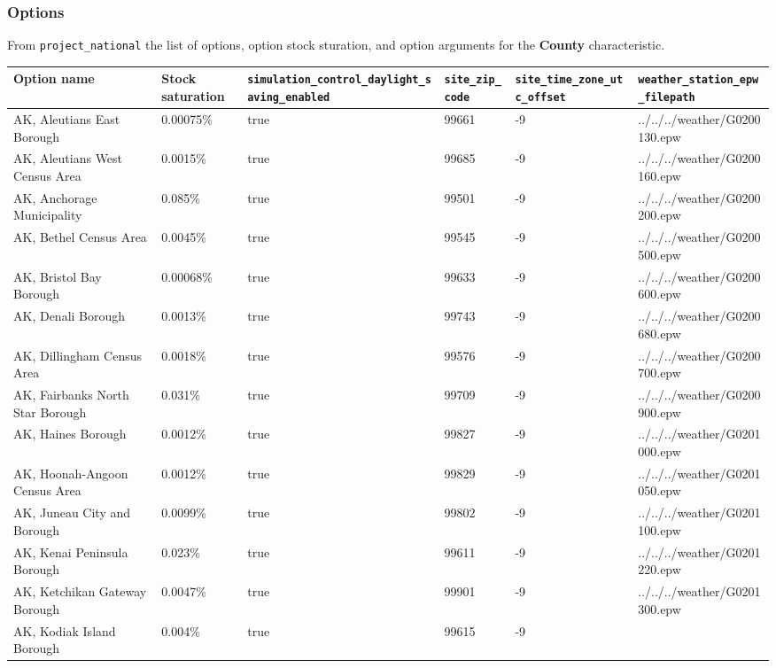 \subsubsection{Options}\label{options-27}

From \texttt{project\_national} the list of options, option stock
sturation, and option arguments for the \textbf{County} characteristic.

\begin{longtable}[]{@{}llllll@{}}
\toprule\noalign{}
Option name & Stock saturation &
\texttt{simulation\_control\_daylight\_saving\_enabled} &
\texttt{site\_zip\_code} & \texttt{site\_time\_zone\_utc\_offset} &
\texttt{weather\_station\_epw\_filepath} \\
\midrule\noalign{}
\endhead
\bottomrule\noalign{}
\endlastfoot
AK, Aleutians East Borough & 0.00075\% & true & 99661 & -9 &
../../../weather/G0200130.epw \\
AK, Aleutians West Census Area & 0.0015\% & true & 99685 & -9 &
../../../weather/G0200160.epw \\
AK, Anchorage Municipality & 0.085\% & true & 99501 & -9 &
../../../weather/G0200200.epw \\
AK, Bethel Census Area & 0.0045\% & true & 99545 & -9 &
../../../weather/G0200500.epw \\
AK, Bristol Bay Borough & 0.00068\% & true & 99633 & -9 &
../../../weather/G0200600.epw \\
AK, Denali Borough & 0.0013\% & true & 99743 & -9 &
../../../weather/G0200680.epw \\
AK, Dillingham Census Area & 0.0018\% & true & 99576 & -9 &
../../../weather/G0200700.epw \\
AK, Fairbanks North Star Borough & 0.031\% & true & 99709 & -9 &
../../../weather/G0200900.epw \\
AK, Haines Borough & 0.0012\% & true & 99827 & -9 &
../../../weather/G0201000.epw \\
AK, Hoonah-Angoon Census Area & 0.0012\% & true & 99829 & -9 &
../../../weather/G0201050.epw \\
AK, Juneau City and Borough & 0.0099\% & true & 99802 & -9 &
../../../weather/G0201100.epw \\
AK, Kenai Peninsula Borough & 0.023\% & true & 99611 & -9 &
../../../weather/G0201220.epw \\
AK, Ketchikan Gateway Borough & 0.0047\% & true & 99901 & -9 &
../../../weather/G0201300.epw \\
AK, Kodiak Island Borough & 0.004\% & true & 99615 & -9 &

\end{longtable}
